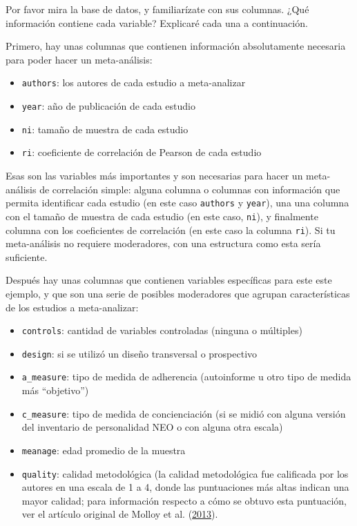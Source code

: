 \documentclass[
  bookmarksnumbered]{article}
\providecommand{\tightlist}{%
  \setlength{\itemsep}{0pt}\setlength{\parskip}{0pt}}
\begin{document}
Por favor mira la base de datos, y familiarízate con sus columnas. ¿Qué información contiene cada variable? Explicaré cada una a continuación.

Primero, hay unas columnas que contienen información absolutamente necesaria para poder hacer un meta-análisis:

\begin{itemize}
\tightlist
\item
  \texttt{authors}: los autores de cada estudio a meta-analizar
\item
  \texttt{year}: año de publicación de cada estudio
\item
  \texttt{ni}: tamaño de muestra de cada estudio
\item
  \texttt{ri}: coeficiente de correlación de Pearson de cada estudio
\end{itemize}

Esas son las variables más importantes y son necesarias para hacer un meta-análisis de correlación simple: alguna columna o columnas con información que permita identificar cada estudio (en este caso \texttt{authors} y \texttt{year}), una una columna con el tamaño de muestra de cada estudio (en este caso, \texttt{ni}), y finalmente columna con los coeficientes de correlación (en este caso la columna \texttt{ri}). Si tu meta-análisis no requiere moderadores, con una estructura como esta sería suficiente.

Después hay unas columnas que contienen variables específicas para este este ejemplo, y que son una serie de posibles moderadores que agrupan características de los estudios a meta-analizar:

\begin{itemize}
\item
  \texttt{controls}: cantidad de variables controladas (ninguna o múltiples)
\item
  \texttt{design}: si se utilizó un diseño transversal o prospectivo
\item
  \texttt{a\_measure}: tipo de medida de adherencia (autoinforme u otro tipo de medida más ``objetivo'')
\item
  \texttt{c\_measure}: tipo de medida de concienciación (si se midió con alguna versión del inventario de personalidad NEO o con alguna otra escala)
\item
  \texttt{meanage}: edad promedio de la muestra
\item
  \texttt{quality}: calidad metodológica (la calidad metodológica fue calificada por los autores en una escala de 1 a 4, donde las puntuaciones más altas indican una mayor calidad; para información respecto a cómo se obtuvo esta puntuación, ver el artículo original de Molloy et al. (\protect\hyperlink{ref-molloy2013}{2013}).
\end{itemize}
\end{document}
